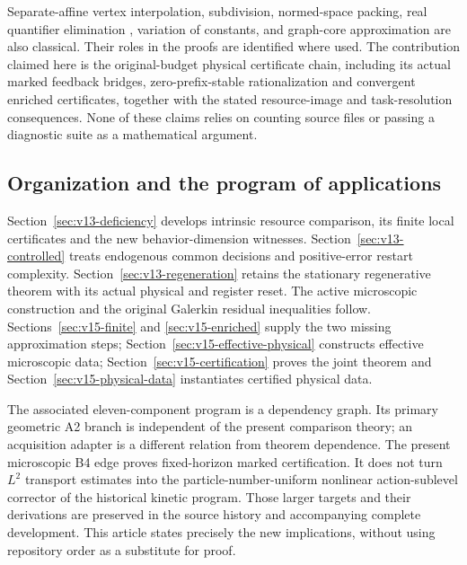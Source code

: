 Separate-affine vertex interpolation, subdivision, normed-space packing,
real quantifier elimination \cite{Basu2014}, variation of constants,
and graph-core approximation \cite{Trotter1958} are also classical.
Their roles in the proofs are identified where used. The contribution
claimed here is the original-budget physical certificate chain,
including its actual marked feedback bridges, zero-prefix-stable
rationalization and convergent enriched certificates, together with
the stated resource-image and task-resolution consequences. None of
these claims relies on counting source files or passing a diagnostic
suite as a mathematical argument.

\subsection{Organization and the program of applications}
Section~\ref{sec:v13-deficiency} develops intrinsic resource comparison,
its finite local certificates and the new behavior-dimension witnesses.
Section~\ref{sec:v13-controlled} treats endogenous common decisions and
positive-error restart complexity. Section~\ref{sec:v13-regeneration}
retains the stationary regenerative theorem with its actual physical
and register reset. The active microscopic construction and the original
Galerkin residual inequalities follow. Sections~\ref{sec:v15-finite}
and \ref{sec:v15-enriched} supply the two missing approximation steps;
Section~\ref{sec:v15-effective-physical} constructs effective
microscopic data; Section~\ref{sec:v15-certification} proves the joint theorem and
Section~\ref{sec:v15-physical-data} instantiates certified physical data.

The associated eleven-component program is a dependency graph. Its
primary geometric A2 branch is independent of the present comparison
theory; an acquisition adapter is a different relation from theorem
dependence. The present microscopic B4 edge proves fixed-horizon marked
certification. It does not turn $L^2$ transport estimates into the
particle-number-uniform nonlinear action-sublevel corrector of the
historical kinetic program. Those larger targets and their derivations
are preserved in the source history and accompanying complete development.
This article states precisely the new implications, without using
repository order as a substitute for proof.
